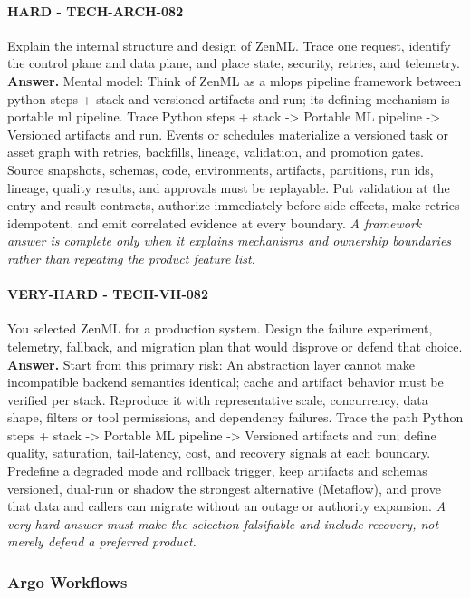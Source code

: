 \paragraph{HARD - TECH-ARCH-082} Explain the internal structure and design of ZenML. Trace one request, identify the control plane and data plane, and place state, security, retries, and telemetry.
\textbf{Answer.} Mental model: Think of ZenML as a mlops pipeline framework between python steps + stack and versioned artifacts and run; its defining mechanism is portable ml pipeline. Trace Python steps + stack -> Portable ML pipeline -> Versioned artifacts and run. Events or schedules materialize a versioned task or asset graph with retries, backfills, lineage, validation, and promotion gates. Source snapshots, schemas, code, environments, artifacts, partitions, run ids, lineage, quality results, and approvals must be replayable. Put validation at the entry and result contracts, authorize immediately before side effects, make retries idempotent, and emit correlated evidence at every boundary.
\textit{A framework answer is complete only when it explains mechanisms and ownership boundaries rather than repeating the product feature list.}
\paragraph{VERY-HARD - TECH-VH-082} You selected ZenML for a production system. Design the failure experiment, telemetry, fallback, and migration plan that would disprove or defend that choice.
\textbf{Answer.} Start from this primary risk: An abstraction layer cannot make incompatible backend semantics identical; cache and artifact behavior must be verified per stack. Reproduce it with representative scale, concurrency, data shape, filters or tool permissions, and dependency failures. Trace the path Python steps + stack -> Portable ML pipeline -> Versioned artifacts and run; define quality, saturation, tail-latency, cost, and recovery signals at each boundary. Predefine a degraded mode and rollback trigger, keep artifacts and schemas versioned, dual-run or shadow the strongest alternative (Metaflow), and prove that data and callers can migrate without an outage or authority expansion.
\textit{A very-hard answer must make the selection falsifiable and include recovery, not merely defend a preferred product.}
\subsubsection*{Argo Workflows}
